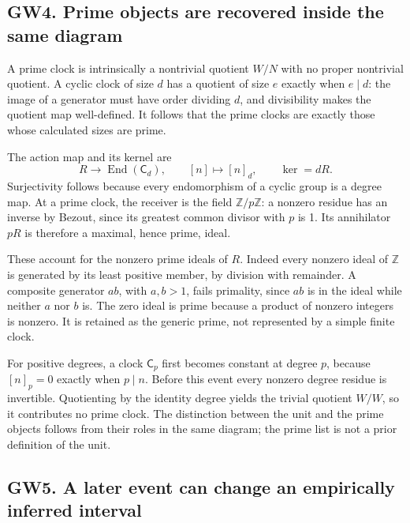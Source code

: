 \subsection{GW4. Prime objects are recovered inside the same
diagram}\label{gw20260924-gw4.-prime-objects-are-recovered-inside-the-same-diagram}

A prime clock is intrinsically a nontrivial quotient \(W/N\) with no
proper nontrivial quotient. A cyclic clock of size \(d\) has a quotient
of size \(e\) exactly when \(e\mid d\): the image of a generator must
have order dividing \(d\), and divisibility makes the quotient map
well-defined. It follows that the prime clocks are exactly those whose
calculated sizes are prime.

The action map and its kernel are \[
R\longrightarrow\operatorname{End}(\mathsf C_d),
\qquad[n]\longmapsto[n]_d,
\qquad\ker=dR.
\tag{GW4.1}
\] Surjectivity follows because every endomorphism of a cyclic group is
a degree map. At a prime clock, the receiver is the field
\(\mathbb Z/p\mathbb Z\): a nonzero residue has an inverse by Bezout,
since its greatest common divisor with \(p\) is 1. Its annihilator
\(pR\) is therefore a maximal, hence prime, ideal.

These account for the nonzero prime ideals of \(R\). Indeed every
nonzero ideal of \(\mathbb Z\) is generated by its least positive
member, by division with remainder. A composite generator \(ab\), with
\(a,b>1\), fails primality, since \(ab\) is in the ideal while neither
\(a\) nor \(b\) is. The zero ideal is prime because a product of nonzero
integers is nonzero. It is retained as the generic prime, not
represented by a simple finite clock.

For positive degrees, a clock \(\mathsf C_p\) first becomes constant at
degree \(p\), because \([n]_p=0\) exactly when \(p\mid n\). Before this
event every nonzero degree residue is invertible. Quotienting by the
identity degree yields the trivial quotient \(W/W\), so it contributes
no prime clock. The distinction between the unit and the prime objects
follows from their roles in the same diagram; the prime list is not a
prior definition of the unit.

\subsection{GW5. A later event can change an empirically inferred
interval}\label{gw20260924-gw5.-a-later-event-can-change-an-empirically-inferred-interval}

